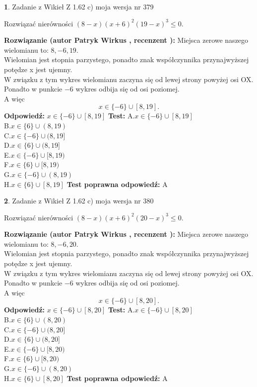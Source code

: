 \documentclass[12pt, a4paper]{article}
\theoremstyle{definition} %
\newtheorem{zad}{}
\newcommand{\zadStart}[1]{\begin{zad}#1\newline}
\newcommand{\zadStop}{\end{zad}}
\newcommand{\rozwStart}[2]{\noindent \textbf{Rozwiązanie (autor #1 , recenzent #2): }\newline}
\newcommand{\rozwStop}{\newline}
\newcommand{\odpStart}{\noindent \textbf{Odpowiedź:}\newline}
\newcommand{\odpStop}{\newline}
\newcommand{\testStart}{\noindent \textbf{Test:}\newline}
\newcommand{\testStop}{\newline}
\newcommand{\kluczStart}{\noindent \textbf{Test poprawna odpowiedź:}\newline}
\newcommand{\kluczStop}{\newline}
\begin{document}
\zadStart{Zadanie z Wikieł Z 1.62 c) moja wersja nr 379}

Rozwiązać nierówności $(8-x)(x+6)^{2}(19-x)^{3}\le0$.
\zadStop
\rozwStart{Patryk Wirkus}{}
Miejsca zerowe naszego wielomianu to: $8, -6, 19$.\\
Wielomian jest stopnia parzystego, ponadto znak współczynnika przy\linebreak najwyższej potędze x jest ujemny.\\ W związku z tym wykres wielomianu zaczyna się od lewej strony powyżej osi OX.\\
Ponadto w punkcie $-6$ wykres odbija się od osi poziomej.\\
A więc $$x \in \{-6\} \cup [8,19].$$
\rozwStop
\odpStart
$x \in \{-6\} \cup [8,19]$
\odpStop
\testStart
A.$x \in \{-6\} \cup [8,19]$\\
B.$x \in \{6\} \cup (8,19)$\\
C.$x \in \{-6\} \cup (8,19]$\\
D.$x \in \{6\} \cup (8,19]$\\
E.$x \in \{-6\} \cup [8,19)$\\
F.$x \in \{6\} \cup [8,19)$\\
G.$x \in \{-6\} \cup (8,19)$\\
H.$x \in \{6\} \cup [8,19]$
\testStop
\kluczStart
A
\kluczStop



\zadStart{Zadanie z Wikieł Z 1.62 c) moja wersja nr 380}

Rozwiązać nierówności $(8-x)(x+6)^{2}(20-x)^{3}\le0$.
\zadStop
\rozwStart{Patryk Wirkus}{}
Miejsca zerowe naszego wielomianu to: $8, -6, 20$.\\
Wielomian jest stopnia parzystego, ponadto znak współczynnika przy\linebreak najwyższej potędze x jest ujemny.\\ W związku z tym wykres wielomianu zaczyna się od lewej strony powyżej osi OX.\\
Ponadto w punkcie $-6$ wykres odbija się od osi poziomej.\\
A więc $$x \in \{-6\} \cup [8,20].$$
\rozwStop
\odpStart
$x \in \{-6\} \cup [8,20]$
\odpStop
\testStart
A.$x \in \{-6\} \cup [8,20]$\\
B.$x \in \{6\} \cup (8,20)$\\
C.$x \in \{-6\} \cup (8,20]$\\
D.$x \in \{6\} \cup (8,20]$\\
E.$x \in \{-6\} \cup [8,20)$\\
F.$x \in \{6\} \cup [8,20)$\\
G.$x \in \{-6\} \cup (8,20)$\\
H.$x \in \{6\} \cup [8,20]$
\testStop
\kluczStart
A
\kluczStop
\end{document}
